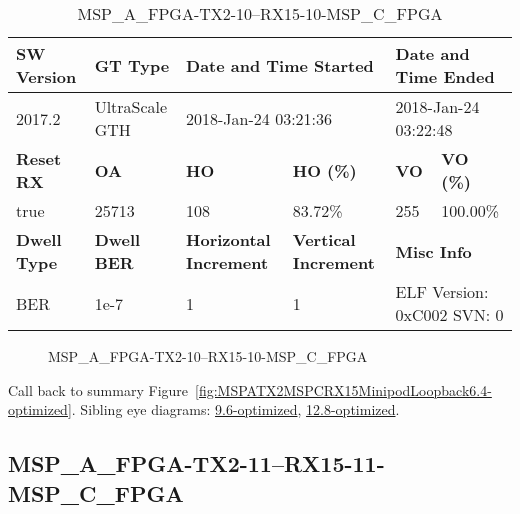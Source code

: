 \begin{table}[h]
\centering
\caption{MSP\_A\_FPGA-TX2-10--RX15-10-MSP\_C\_FPGA}
\label{tab:MSPAFPGATX210RX1510MSPCFPGA6.4-optimized}
\begin{tabular}{@{}|l|l|l|l|l|l|@{}}
\toprule
\textbf{SW Version}                & \textbf{GT Type}   & \multicolumn{2}{l|}{\textbf{Date and Time Started}}            & \multicolumn{2}{l|}{\textbf{Date and Time Ended}}        \\ \midrule
2017.2                       & UltraScale GTH          & \multicolumn{2}{l|}{2018-Jan-24 03:21:36}                   & \multicolumn{2}{l|}{2018-Jan-24 03:22:48}               \\ \midrule
\textbf{Reset RX}                  & \textbf{OA} & \textbf{HO}   & \textbf{HO (\%)} & \textbf{VO} & \textbf{VO (\%)} \\ \midrule
true & 25713        & 108          & 83.72\%        & 255        & 100.00\%       \\ \midrule
\textbf{Dwell Type}                & \textbf{Dwell BER} & \textbf{Horizontal Increment} & \textbf{Vertical Increment}    & \multicolumn{2}{l|}{\textbf{Misc Info}}                  \\ \midrule
BER                            & 1e-7        & 1        & 1           & \multicolumn{2}{l|}{ELF Version: 0xC002 SVN: 0}                         \\ \bottomrule
\end{tabular}
\end{table}

\begin{figure}[h]
\caption{MSP\_A\_FPGA-TX2-10--RX15-10-MSP\_C\_FPGA} \label{fig:MSPAFPGATX210RX1510MSPCFPGA6.4-optimized}
\end{figure}

Call back to summary Figure~\ref{fig:MSPATX2MSPCRX15MinipodLoopback6.4-optimized}.
Sibling eye diagrams: \hyperref[sec:MSPAFPGATX210RX1510MSPCFPGA9.6-optimized]{9.6-optimized}, \hyperref[sec:MSPAFPGATX210RX1510MSPCFPGA12.8-optimized]{12.8-optimized}.

\clearpage
\newpage


\subsection{MSP\_A\_FPGA-TX2-11--RX15-11-MSP\_C\_FPGA}\label{sec:MSPAFPGATX211RX1511MSPCFPGA6.4-optimized}

